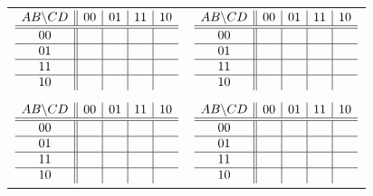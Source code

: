 \documentclass{article}
\begin{document}
\begin{tabular}{ll}

$ \begin{array} {c||c|c|c|c}
        AB \backslash CD & 00 & 01 & 11 & 10 \\ \hline \hline
        00        &    &    &    &    \\ \hline
        01        &    &    &    &    \\ \hline
        11        &    &    &    &    \\ \hline
        10        &    &    &    &    \\
\end{array} $

& 

$ \begin{array} {c||c|c|c|c}
        AB \backslash CD & 00 & 01 & 11 & 10 \\ \hline \hline
        00        &    &    &    &    \\ \hline
        01        &    &    &    &    \\ \hline
        11        &    &    &    &    \\ \hline
        10        &    &    &    &    \\
\end{array} $

\\ 
\vspace{0.2in} & \vspace{0.2in} 

\\

$ \begin{array} {c||c|c|c|c}
        AB \backslash CD & 00 & 01 & 11 & 10 \\ \hline \hline
        00        &    &    &    &    \\ \hline
        01        &    &    &    &    \\ \hline
        11        &    &    &    &    \\ \hline
        10        &    &    &    &    \\
\end{array} $

& 

$ \begin{array} {c||c|c|c|c}
        AB \backslash CD & 00 & 01 & 11 & 10 \\ \hline \hline
        00        &    &    &    &    \\ \hline
        01        &    &    &    &    \\ \hline
        11        &    &    &    &    \\ \hline
        10        &    &    &    &    \\
\end{array} $

\\


\end{tabular}
\end{document}
